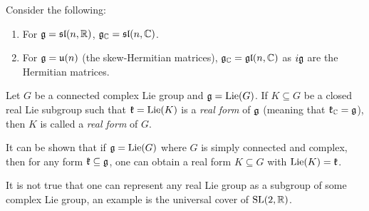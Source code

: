 \begin{example}
  Consider the following:
  \begin{enumerate}
    \item For $\mathfrak{g} = \mathfrak{sl}(n, \mathbb{R})$,
      $\mathfrak{g}_{\mathbb{C}} = \mathfrak{sl}(n, \mathbb{C})$.
    \item For $\mathfrak{g} = \mathfrak{u}(n)$
      (the skew-Hermitian matrices),
      $\mathfrak{g}_{\mathbb{C}} = \mathfrak{gl}(n, \mathbb{C})$ as
      $i \mathfrak{g}$ are the Hermitian
      matrices.
  \end{enumerate}
\end{example}

\begin{definition}
  Let $G$ be a connected complex Lie
  group and $\mathfrak{g} = \operatorname{Lie}(G)$. If
  $K \subseteq G$ be a closed real Lie
  subgroup such that $\mathfrak{k} = \operatorname{Lie}(K)$
  is a \emph{real form} of $\mathfrak{g}$ (meaning
  that $\mathfrak{k}_{\mathbb{C}} = \mathfrak{g}$), then
  $K$ is called a \emph{real form} of $G$.
\end{definition}

\begin{remark}
  It can be shown that if
  $\mathfrak{g} = \operatorname{Lie}(G)$ where $G$ is simply
  connected and complex, then for any
  form $\mathfrak{k} \subseteq \mathfrak{g}$,
  one can obtain a real form
  $K \subseteq G$ with
  $\operatorname{Lie}(K) = \mathfrak{k}$.

  It is not true that one can represent
  any real Lie group as a subgroup of some
  complex Lie group, an example is
  the universal cover of $\operatorname{SL}(2, \mathbb{R})$.
\end{remark}

